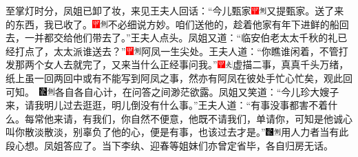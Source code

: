 至掌灯时分，凤姐已卸了妆，来见王夫人回话：“今儿甄家{\includegraphics[width=3mm]{../Images/00002}\includegraphics[width=3mm]{../Images/00011}\footnotesize \kaishu 又提甄家。}送了来的东西，我已收了。{\includegraphics[width=3mm]{../Images/00002}\includegraphics[width=3mm]{../Images/00011}\footnotesize \kaishu 不必细说方妙。}咱们送他的，趁着他家有年下进鲜的船回去，一并都交给他们带去了。”王夫人点头。凤姐又道：“临安伯老太太千秋的礼已经打点了，太太派谁送去？”{{\includegraphics[width=3mm]{../Images/00002}\includegraphics[width=3mm]{../Images/00011}\footnotesize \kaishu 阿凤一生尖处。}}王夫人道：“你瞧谁闲着，不管打发那两个女人去就完了，又来当什么正经事问我。”{{\includegraphics[width=3mm]{../Images/00002}\includegraphics[width=3mm]{../Images/00012}\footnotesize \kaishu 虚描二事，真真千头万绪，纸上虽一回两回中或有不能写到阿凤之事，然亦有阿凤在彼处手忙心忙矣，观此回可知。　}\includegraphics[width=3mm]{../Images/00006}\includegraphics[width=3mm]{../Images/00011}\footnotesize \kaishu 各自各自心计，在问答之间渺茫欲露。}凤姐又笑道：“今儿珍大嫂子来，请我明儿过去逛逛，明儿倒没有什么事。”王夫人道：“有事没事都害不着什么。每常他来请，有我们，你自然不便意，他既不请我们，单请你，可知是他诚心叫你散淡散淡，别辜负了他的心，便是有事，也该过去才是。”{\includegraphics[width=3mm]{../Images/00006}\includegraphics[width=3mm]{../Images/00011}\footnotesize \kaishu 用人力者当有此段心想。}凤姐答应了。当下李纨、迎春等姐妹们亦曾定省毕，各自归房无话。

